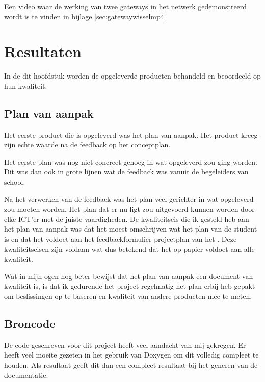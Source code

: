 \documentclass[a4paper, 11pt, oneside]{report}
\begin{document}
Een video waar de werking van twee gateways in het netwerk gedemonstreerd wordt is te vinden in bijlage  \ref{sec:gatewaywisselmp4}

\chapter{Resultaten}\label{sec:resultaten}

In de dit hoofdstuk worden de opgeleverde producten behandeld en beoordeeld op hun kwaliteit.

\section{Plan van aanpak}\label{sec:plan-van-aanpak}
Het eerste product die is opgeleverd was het plan van aanpak.
Het product kreeg zijn echte waarde na de feedback op het conceptplan.

Het eerste plan was nog niet concreet genoeg in wat opgeleverd zou ging worden. 
Dit was dan ook in grote lijnen wat de feedback was vanuit de begeleiders van school.

Na het verwerken van de feedback was het plan veel gerichter in wat opgeleverd zou moeten worden.
Het plan dat er nu ligt zou uitgevoerd kunnen worden door elke ICT'er met de juiste vaardigheden.
De kwaliteitseis die ik gesteld heb aan het plan van aanpak was dat het moest omschrijven wat het plan van de student is en dat het voldoet aan het feedbackformulier projectplan van het \citeauthor{HANfeed} \citeyear{HANfeed}. Deze kwaliteitseisen zijn voldaan wat dus betekend dat het op papier voldoet aan alle kwaliteit.

Wat in mijn ogen nog beter bewijst dat het plan van aanpak een document van kwaliteit is, is dat ik gedurende het project regelmatig het plan erbij heb gepakt om beslissingen op te baseren en kwaliteit van andere producten mee te meten.

\section{Broncode}\label{sec:broncode}
De code geschreven voor dit project heeft veel aandacht van mij gekregen. 
Er heeft veel moeite gezeten in het gebruik van Doxygen om dit volledig compleet te houden.
Als resultaat geeft dit dan een compleet resultaat bij het generen van de documentatie. 
\end{document}
